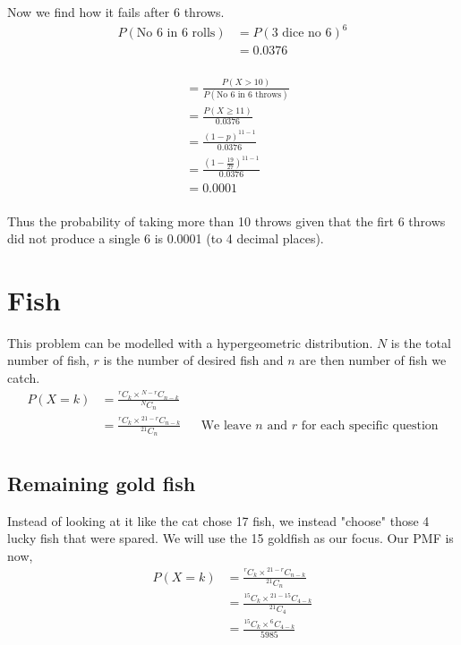 \documentclass{article}
\begin{document}
Now we find how it fails after 6 throws.
\begin{align*}
    P(\text{No 6 in 6 rolls}) &= P(\text{3 dice no 6})^6 \\
    &= 0.0376 \\
\end{align*}

\begin{align*}
    &= \frac{P(X>10)}{P(\text{No 6 in 6 throws})} \\
    &= \frac{P(X\geq11)}{0.0376} \\
    &= \frac{(1-p)^{11-1}}{0.0376} \\
    &= \frac{\left(1-\frac{19}{27}\right)^{11-1}}{0.0376} \\
    &= 0.0001 \\
\end{align*}

Thus the probability of taking more than 10 throws given that the firt 6 throws
did not produce a single 6 is 0.0001 (to 4 decimal places).

\section{Fish}
This problem can be modelled with a hypergeometric distribution. $N$ is the
total number of fish, $r$ is the number of desired fish and $n$ are then number
of fish we catch.
\begin{align*}
    P(X=k) &= \frac{{}^rC_k \times {}^{N-r}C_{n-k}}{{}^NC_n} \\
    &= \frac{{}^rC_k \times {}^{21-r}C_{n-k}}{{}^{21}C_n}
    && \text{We leave $n$ and $r$ for each specific question} \\
\end{align*}

\subsection{Remaining gold fish}
Instead of looking at it like the cat chose 17 fish, we instead "choose" those
4 lucky fish that were spared. We will use the 15 goldfish as our focus.
Our PMF is now,
\begin{align*}
    P(X=k) &= \frac{{}^rC_k \times {}^{21-r}C_{n-k}}{{}^{21}C_n} \\
    &= \frac{{}^{15}C_k \times {}^{21-15}C_{4-k}}{{}^{21}C_4} \\
    &= \frac{{}^{15}C_k \times {}^{6}C_{4-k}}{5985} \\
\end{align*}
\end{document}
